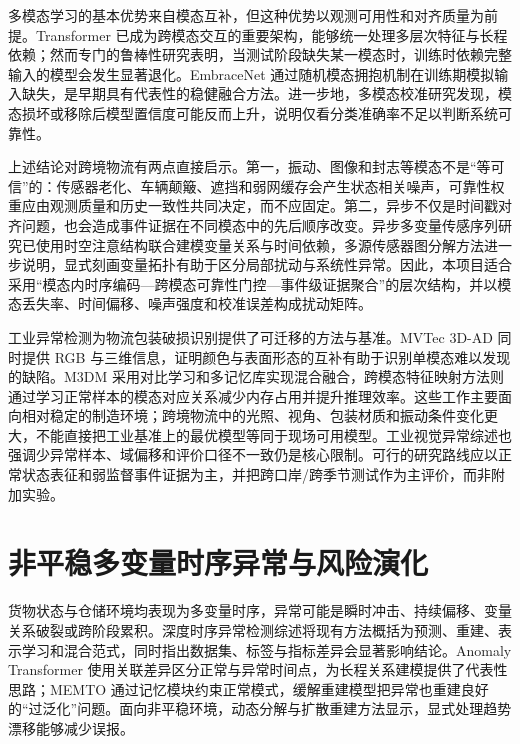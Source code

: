 \documentclass[UTF8,12pt,a4paper]{ctexart}
\begin{document}
多模态学习的基本优势来自模态互补，但这种优势以观测可用性和对齐质量为前提。Transformer 已成为跨模态交互的重要架构，能够统一处理多层次特征与长程依赖\cite{multimodallearningwith2023}；然而专门的鲁棒性研究表明，当测试阶段缺失某一模态时，训练时依赖完整输入的模型会发生显著退化\cite{aremultimodaltransformers2022}。EmbraceNet 通过随机模态拥抱机制在训练期模拟输入缺失，是早期具有代表性的稳健融合方法\cite{embracenetarobust2019}。进一步地，多模态校准研究发现，模态损坏或移除后模型置信度可能反而上升，说明仅看分类准确率不足以判断系统可靠性\cite{calibratingmultimodallearning2023}。

上述结论对跨境物流有两点直接启示。第一，振动、图像和封志等模态不是“等可信”的：传感器老化、车辆颠簸、遮挡和弱网缓存会产生状态相关噪声，可靠性权重应由观测质量和历史一致性共同决定，而不应固定。第二，异步不仅是时间戳对齐问题，也会造成事件证据在不同模态中的先后顺序改变。异步多变量传感序列研究已使用时空注意结构联合建模变量关系与时间依赖\cite{anomalydetectionfor2024}，多源传感器图分解方法进一步说明，显式刻画变量拓扑有助于区分局部扰动与系统性异常\cite{graphbasedtime2024}。因此，本项目适合采用“模态内时序编码—跨模态可靠性门控—事件级证据聚合”的层次结构，并以模态丢失率、时间偏移、噪声强度和校准误差构成扰动矩阵。

工业异常检测为物流包装破损识别提供了可迁移的方法与基准。MVTec 3D-AD 同时提供 RGB 与三维信息，证明颜色与表面形态的互补有助于识别单模态难以发现的缺陷\cite{themvtec3d2022}。M3DM 采用对比学习和多记忆库实现混合融合\cite{multimodalindustrialanomaly2023}，跨模态特征映射方法则通过学习正常样本的模态对应关系减少内存占用并提升推理效率\cite{multimodalindustrialanomaly2024}。这些工作主要面向相对稳定的制造环境；跨境物流中的光照、视角、包装材质和振动条件变化更大，不能直接把工业基准上的最优模型等同于现场可用模型。工业视觉异常综述也强调少异常样本、域偏移和评价口径不一致仍是核心限制\cite{deepindustrialimage2024}。可行的研究路线应以正常状态表征和弱监督事件证据为主，并把跨口岸/跨季节测试作为主评价，而非附加实验。

\section{非平稳多变量时序异常与风险演化}

货物状态与仓储环境均表现为多变量时序，异常可能是瞬时冲击、持续偏移、变量关系破裂或跨阶段累积。深度时序异常检测综述将现有方法概括为预测、重建、表示学习和混合范式，同时指出数据集、标签与指标差异会显著影响结论\cite{deeplearningfor2024}。Anomaly Transformer 使用关联差异区分正常与异常时间点，为长程关系建模提供了代表性思路\cite{anomalytransformertime2022}；MEMTO 通过记忆模块约束正常模式，缓解重建模型把异常也重建良好的“过泛化”问题\cite{memtomemoryguided2023}。面向非平稳环境，动态分解与扩散重建方法显示，显式处理趋势漂移能够减少误报\cite{driftdoesnt2023}。
\end{document}
